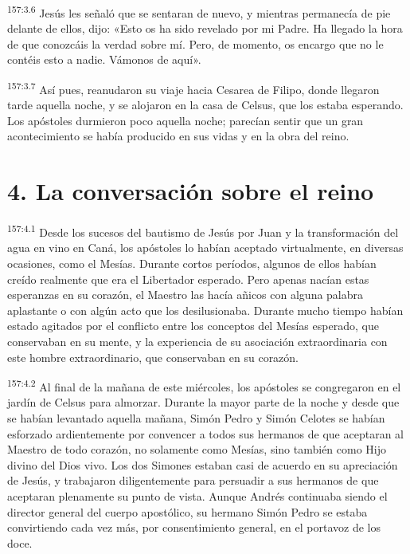 \par 
\textsuperscript{157:3.6} Jesús les señaló que se sentaran de nuevo, y mientras permanecía de pie delante de ellos, dijo: «Esto os ha sido revelado por mi Padre. Ha llegado la hora de que conozcáis la verdad sobre mí. Pero, de momento, os encargo que no le contéis esto a nadie. Vámonos de aquí».

\par 
\textsuperscript{157:3.7} Así pues, reanudaron su viaje hacia Cesarea de Filipo, donde llegaron tarde aquella noche, y se alojaron en la casa de Celsus, que los estaba esperando. Los apóstoles durmieron poco aquella noche; parecían sentir que un gran acontecimiento se había producido en sus vidas y en la obra del reino.

\section*{4. La conversación sobre el reino}
\par 
\textsuperscript{157:4.1} Desde los sucesos del bautismo de Jesús por Juan y la transformación del agua en vino en Caná, los apóstoles lo habían aceptado virtualmente, en diversas ocasiones, como el Mesías. Durante cortos períodos, algunos de ellos habían creído realmente que era el Libertador esperado. Pero apenas nacían estas esperanzas en su corazón, el Maestro las hacía añicos con alguna palabra aplastante o con algún acto que los desilusionaba. Durante mucho tiempo habían estado agitados por el conflicto entre los conceptos del Mesías esperado, que conservaban en su mente, y la experiencia de su asociación extraordinaria con este hombre extraordinario, que conservaban en su corazón.

\par 
\textsuperscript{157:4.2} Al final de la mañana de este miércoles, los apóstoles se congregaron en el jardín de Celsus para almorzar. Durante la mayor parte de la noche y desde que se habían levantado aquella mañana, Simón Pedro y Simón Celotes se habían esforzado ardientemente por convencer a todos sus hermanos de que aceptaran al Maestro de todo corazón, no solamente como Mesías, sino también como Hijo divino del Dios vivo. Los dos Simones estaban casi de acuerdo en su apreciación de Jesús, y trabajaron diligentemente para persuadir a sus hermanos de que aceptaran plenamente su punto de vista. Aunque Andrés continuaba siendo el director general del cuerpo apostólico, su hermano Simón Pedro se estaba convirtiendo cada vez más, por consentimiento general, en el portavoz de los doce.

